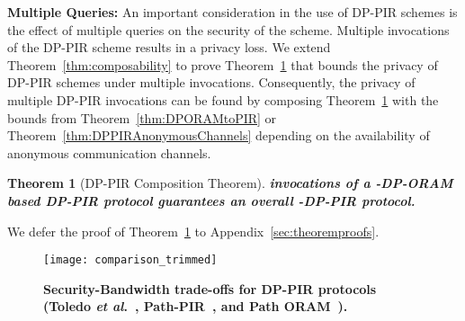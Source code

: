 \documentclass[USenglish,oneside,twocolumn]{article}
\newtheorem{theorem}{Theorem}
\newcommand{\etal}{\textit{et al}.}
\begin{document}
\textbf{Multiple Queries: }
An important consideration in the use of DP-PIR schemes is the effect of multiple queries on the security of the scheme. Multiple invocations of the DP-PIR scheme results in a privacy loss.
We extend Theorem~\ref{thm:composability} to prove Theorem~\ref{thm:DPPIRComposition} that bounds the privacy of DP-PIR schemes under multiple invocations. Consequently, the privacy of multiple DP-PIR invocations can be found by composing Theorem~\ref{thm:DPPIRComposition} with the bounds from Theorem~\ref{thm:DPORAMtoPIR} or Theorem~\ref{thm:DPPIRAnonymousChannels} depending on the availability of anonymous communication channels.
\begin{theorem}[DP-PIR Composition Theorem]\label{thm:DPPIRComposition}
\textbf{ invocations of a -DP-ORAM based DP-PIR protocol guarantees an overall -DP-PIR protocol.}
\end{theorem}
We defer the proof of Theorem~\ref{thm:DPPIRComposition} to Appendix~\ref{sec:theoremproofs}.











\begin{figure}[t]
\centering
\texttt{[image: comparison\_trimmed]}
\vspace{-5pt}
\caption{\textbf{Security-Bandwidth trade-offs for DP-PIR protocols (Toledo \etal~\cite{goldbergDPPIR}, Path-PIR~\cite{mayberry2014efficient}, and Path ORAM~\cite{pathoram}).}}
\label{fig:comparison}
\end{figure}
\end{document}
